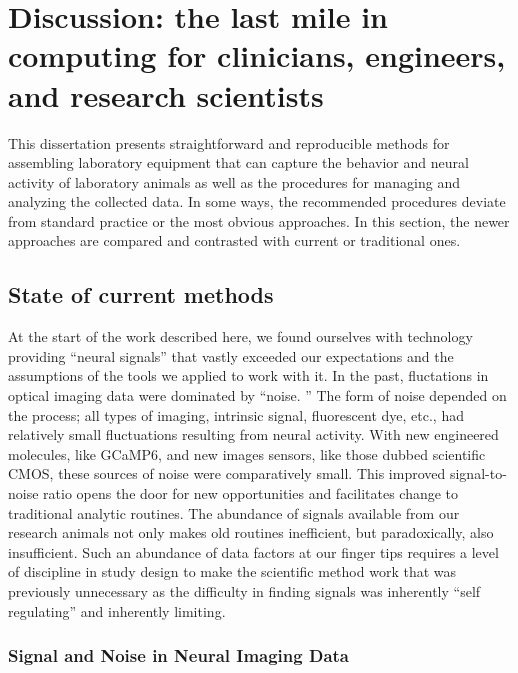 \documentclass[../main.tex]{subfiles}
\begin{document}
\thispagestyle{myheadings}

\chapter{Discussion: the last mile in computing for clinicians, engineers, and research scientists}
\label{sec:discussion}


This dissertation presents straightforward and reproducible methods for assembling laboratory equipment that can capture the behavior and neural activity of laboratory animals as well as the procedures for managing and analyzing the collected data.
In some ways, the recommended procedures deviate from standard practice or the most obvious approaches.
In this section, the newer approaches are compared and contrasted with current or traditional ones.

\section{
  State of current methods}
\label{sec:state-of-current-methods}

At the start of the work described here, we found ourselves with technology providing “neural signals” that vastly exceeded our expectations and the assumptions of the tools we applied to work with it.
In the past, fluctations in optical imaging data were dominated by “noise.
” The form of noise depended on the process; all types of imaging, intrinsic signal, fluorescent dye, etc., had relatively small fluctuations resulting from neural activity.
With new engineered molecules, like GCaMP6, and new images sensors, like those dubbed scientific CMOS, these sources of noise were comparatively small.
This improved signal-to-noise ratio opens the door for new opportunities and facilitates change to traditional analytic routines.
The abundance of signals available from our research animals not only makes old routines inefficient, but paradoxically, also insufficient.
Such an abundance of data factors at our finger tips requires a level of discipline in study design to make the scientific method work that was previously unnecessary as the difficulty in finding signals was inherently “self regulating” and inherently limiting.

\subsection{
	Signal and Noise in Neural Imaging Data}
\label{sec:signal-and-noise-in-neural-imaging-data}
\end{document}

